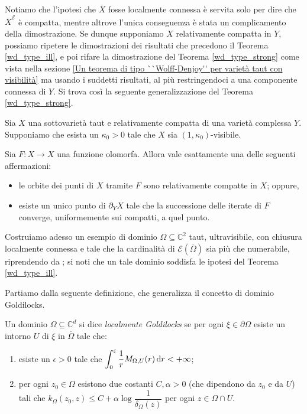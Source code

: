 \begin{oss}
    Notiamo che l'ipotesi che $\overline{X}$ fosse localmente connessa è servita solo per dire che $\overline{X}^\mathcal{E}$ è compatta, mentre altrove l'unica conseguenza è stata un complicamento della dimostrazione. Se dunque supponiamo $X$ relativamente compatta in $Y$, possiamo ripetere le dimostrazioni dei risultati che precedono il Teorema \ref{wd_type_ill}, e poi rifare la dimostrazione del Teorema \ref{wd_type_strong} come vista nella sezione \ref{Un teorema di tipo ``Wolff-Denjoy'' per varietà taut con visibilità} ma usando i suddetti risultati, al più restringendoci a una componente connessa di $Y$. Si trova così la seguente generalizzazione del Teorema \ref{wd_type_strong}.
\end{oss}

\begin{thm} \label{wd_type_ultrastrong}
    Sia $X$ una sottovarietà taut e relativamente compatta di una varietà complessa $Y$. Supponiamo che esista un $\kappa_0>0$ tale che $X$ sia $(1,\kappa_0)$-visibile.
    
    Sia $F:X \longrightarrow X$ una funzione olomorfa. Allora vale esattamente una delle seguenti affermazioni:
    \begin{itemize}
        \item le orbite dei punti di $X$ tramite $F$ sono relativamente compatte in $X$; oppure,
        \item esiste un unico punto di $\partial_YX$ tale che la successione delle iterate di $F$ converge, uniformemente sui compatti, a quel punto.
    \end{itemize}
\end{thm}

Costruiamo adesso un esempio di dominio $\Omega\subseteq\mathbb{C}^2$ taut, ultravisibile, con chiusura localmente connessa e tale che la cardinalità di $\mathcal{E}(\overline{\Omega})$ sia più che numerabile, riprendendo da \cite[Section 2]{BZ2}; si noti che un tale dominio soddisfa le ipotesi del Teorema \ref{wd_type_ill}.

Partiamo dalla seguente definizione, che generalizza il concetto di dominio Goldilocks.

\begin{defn} \label{localgold}
    Un dominio $\Omega\subseteq\mathbb{C}^d$ si dice \textit{localmente Goldilocks} se per ogni $\xi\in\partial\Omega$ esiste un intorno $U$ di $\xi$ in $\overline{\Omega}$ tale che:
    \begin{enumerate}[label={(\arabic*)}]
        \item esiste un $\epsilon>0$ tale che $\displaystyle\int_0^\varepsilon \frac{1}{r}M_{\Omega,U}(r)\mathop{}\!\mathrm{d} r<+\infty$;
        \item per ogni $z_0\in\Omega$ esistono due costanti $C,\alpha>0$ (che dipendono da $z_0$ e da $U$) tali che $k_\Omega(z_0,z)\le C+\alpha\log{\dfrac{1}{\delta_\Omega(z)}}$ per ogni $z\in\Omega\cap U$.
    \end{enumerate}
\end{defn}

